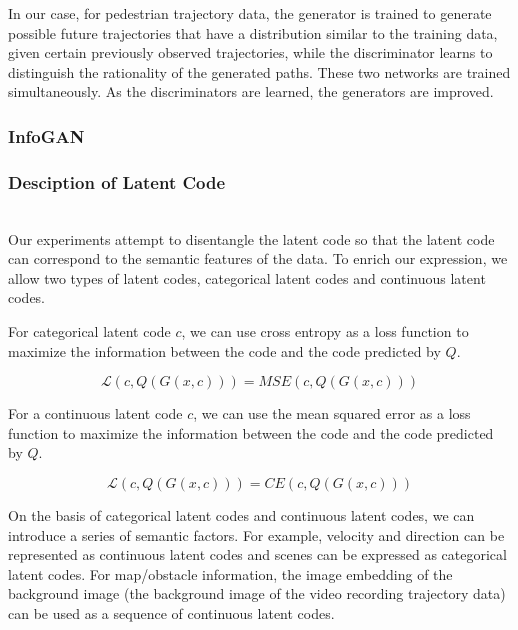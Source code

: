 In our case, for pedestrian trajectory data, the generator is trained to generate possible future trajectories that have a distribution similar to the training data, given certain previously observed trajectories, while the discriminator learns to distinguish the rationality of the generated paths. These two networks are trained simultaneously. As the discriminators are learned, the generators are improved.

\subsubsection{InfoGAN}


\subsubsection{Desciption of Latent Code}

\hfill \\
Our experiments attempt to disentangle the latent code so that the latent code can correspond to the semantic features of the data. To enrich our expression, we allow two types of latent codes, categorical latent codes and continuous latent codes.

For categorical latent code $c$, we can use cross entropy as a loss function to maximize the information between the code and the code predicted by $Q$.


$$\mathcal{L} (c, Q(G(x, c))) = MSE(c, Q(G(x, c))) $$

For a continuous latent code $c$, we can use the mean squared error as a loss function to maximize the information between the code and the code predicted by $Q$.

$$\mathcal{L} (c, Q(G(x, c))) = CE(c, Q(G(x, c))) $$

On the basis of categorical latent codes and continuous latent codes, we can introduce a series of semantic factors. For example, velocity and direction can be represented as continuous latent codes and scenes can be expressed as categorical latent codes. For map/obstacle information, the image embedding of the background image (the background image of the video recording trajectory data) can be used as a sequence of continuous latent codes.